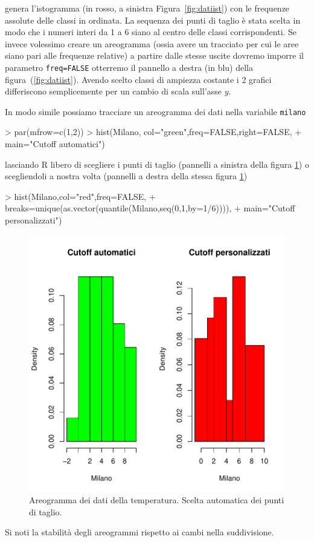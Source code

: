 \documentclass[onecolumn,12pt]{book}
\begin{document}
genera l'istogramma (in rosso, a sinistra Figura~\ref{fig:datiist}) con le frequenze assolute delle classi in ordinata. La sequenza dei punti di taglio \`e stata scelta in modo che i numeri interi da 1 a 6 siano al centro delle classi corrispondenti. Se invece volessimo creare un areogramma  (ossia avere un tracciato per cui le aree siano pari alle frequenze relative) a partire dalle stesse uscite dovremo imporre il parametro \texttt{freq=FALSE} otterremo il pannello a destra (in blu) della figura~(\ref{fig:datiist}). Avendo scelto classi di ampiezza costante i 2 grafici differiscono semplicemente per un cambio di scala sull'asse $y$.

In modo simile possiamo tracciare un areogramma  dei dati nella variabile \texttt{milano}
\begin{Schunk}
\begin{Sinput}
> par(mfrow=c(1,2))
> hist(Milano, col="green",freq=FALSE,right=FALSE,
+ main="Cutoff automatici")
\end{Sinput}
\end{Schunk}
lasciando \textsf{R} libero di scegliere i punti di taglio (pannelli a sinistra della figura \ref{fig:datiistmilano}) o scegliendoli a nostra volta (pannelli a destra della stessa figura  \ref{fig:datiistmilano})
\begin{Schunk}
\begin{Sinput}
> hist(Milano,col="red",freq=FALSE,
+ breaks=unique(as.vector(quantile(Milano,seq(0,1,by=1/6)))),
+ main="Cutoff personalizzati")
\end{Sinput}
\end{Schunk}
\begin{figure}[htbp]
\begin{center}
\includegraphics{RbookParte2-122}
\caption{ Areogramma dei dati della temperatura. Scelta automatica dei punti di taglio.}
\label{fig:datiistmilano}
\end{center}
\end{figure}
Si noti la stabilit\`a degli areogrammi rispetto ai cambi nella suddivisione.
\end{document}

